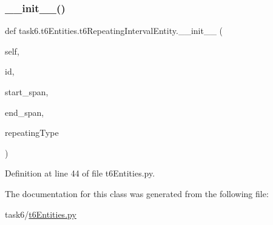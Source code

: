\subsubsection{\texorpdfstring{\+\_\+\+\_\+init\+\_\+\+\_\+()}{\_\_init\_\_()}}
{\footnotesize\ttfamily def task6.\+t6\+Entities.\+t6\+Repeating\+Interval\+Entity.\+\_\+\+\_\+init\+\_\+\+\_\+ (\begin{DoxyParamCaption}\item[{}]{self,  }\item[{}]{id,  }\item[{}]{start\+\_\+span,  }\item[{}]{end\+\_\+span,  }\item[{}]{repeating\+Type }\end{DoxyParamCaption})}



Definition at line 44 of file t6\+Entities.\+py.



The documentation for this class was generated from the following file\+:\begin{DoxyCompactItemize}
\item 
task6/\hyperlink{t6Entities_8py}{t6\+Entities.\+py}\end{DoxyCompactItemize}
